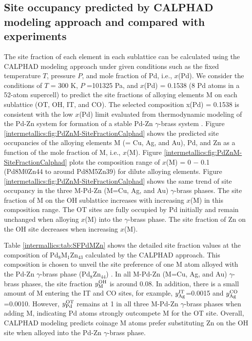 \subsection{Site occupancy predicted by CALPHAD modeling approach and compared with experiments} \label{intermetallics:ssec:PdZnMDFTresult}
The site fraction of each element in each sublattice can be calculated using the CALPHAD modeling approach under given conditions such as the fixed temperature $T$, pressure $P$, and mole fraction of Pd, i.e., $x$(Pd). We consider the conditions of $T$ = 300 K, $P$ =101325 Pa, and $x$(Pd) = 0.1538 (8 Pd atoms in a 52-atom supercell) to predict the site fractions of alloying elements M on each sublattice (OT, OH, IT, and CO). The selected composition x(Pd) = 0.1538 is consistent with the low $x$(Pd) limit evaluated from thermodynamic modeling of the Pd-Zn system for formation of a stable Pd-Zn $\gamma$-brass system \cite{gong2022thermodynamic}. Figure \ref{intermetallics:fig:PdZnM-SiteFractionCalphad} shows the predicted site occupancies of the alloying elements M (= Cu, Ag, and Au), Pd, and Zn as a function of the mole fraction of M, i.e., $x$(M). Figure \ref{intermetallics:fig:PdZnM-SiteFractionCalphad} plots the composition range of $x$(M) = 0 $-$ 0.1 (Pd8M0Zn44 to around Pd8M5Zn39) for dilute alloying elements. Figure \ref{intermetallics:fig:PdZnM-SiteFractionCalphad} shows the same trend of site occupancy in the three M-Pd-Zn (M=Cu, Ag, and Au) $\gamma$-brass phases. The site fraction of M on the OH sublattice increases with increasing $x$(M) in this composition range. The OT sites are fully occupied by Pd initially and remain unchanged when alloying $x$(M) into the $\gamma$-brass phase. The site fraction of Zn on the OH site decreases when increasing $x$(M). 

Table \ref{intermallics:tab:SFPdMZn} shows the detailed site fraction values at the composition of Pd$_8$M$_1$Zn$_{43}$ calculated by the CALPHAD approach. This composition is chosen to unveil the site preference of one M atom alloyed with the Pd-Zn $\gamma$-brass phase (Pd$_8$Zn$_{44}$) \cite{gong2022thermodynamic}. In all M-Pd-Zn (M=Cu, Ag, and Au) $\gamma$-brass phases, the site fraction $y_{\rm M}^{\rm OH}$ is around 0.08. In addition, there is a small amount of M entering the IT and CO sites, for example, $y_{\rm Ag}^{\rm IT}$=0.0015 and $y_{\rm Ag}^{\rm CO}$=0.0010. However, $y_{\rm Pd}^{\rm OT}$ remains at 1 in all three M-Pd-Zn $\gamma$-brass phases when adding M, indicating Pd atoms strongly outcompete M for the OT site. Overall, CALPHAD modeling predicts coinage M atoms prefer substituting Zn on the OH site when alloyed into the Pd-Zn $\gamma$-brass phase. 

